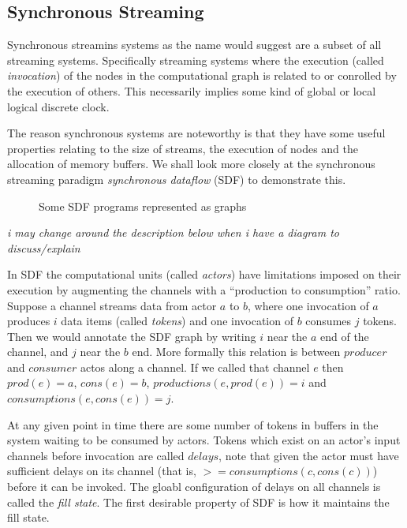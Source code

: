 \subsection{Synchronous Streaming}
\label{BACK_SYNC}

Synchronous streamins systems as the name would suggest are a subset of all streaming systems.
Specifically streaming systems where the execution (called {\em invocation}) of the nodes in the computational graph is related to or conrolled by the execution of others.
This necessarily implies some kind of global or local logical discrete clock.

The reason synchronous systems are noteworthy is that they have some useful properties relating to the size of streams, the execution of nodes and the allocation of memory buffers.
We shall look more closely at the synchronous streaming paradigm {\em synchronous dataflow} (SDF) to demonstrate this.

\begin{figure}
\begin{center}
	
\caption{Some SDF programs represented as graphs}
\label{figSimpleSDF}
\end{center}
\end{figure}

{\em i may change around the description below when i have a diagram to discuss/explain}

In SDF the computational units (called {\em actors}) have limitations imposed on their execution by augmenting the channels with a ``production to consumption'' ratio.
Suppose a channel streams data from actor $a$ to $b$, where one invocation of $a$ produces $i$ data items (called {\em tokens}) and one invocation of $b$ consumes $j$ tokens.
Then we would annotate the SDF graph by writing $i$ near the $a$ end of the channel, and $j$ near the $b$ end.
More formally this relation is between $producer$ and $consumer$ actos along a channel.
If we called that channel $e$ then $prod(e) = a$, $cons(e) = b$, $productions(e, prod(e)) = i$ and $consumptions(e, cons(e)) = j$.

At any given point in time there are some number of tokens in buffers in the system waiting to be consumed by actors.
Tokens which exist on an actor's input channels before invocation are called $delays$, note that given the actor must have sufficient delays on its channel (that is, $>= consumptions(c, cons(c))$) before it can be invoked.
The gloabl configuration of delays on all channels is called the {\em fill state}.
The first desirable property of SDF is how it maintains the fill state.

